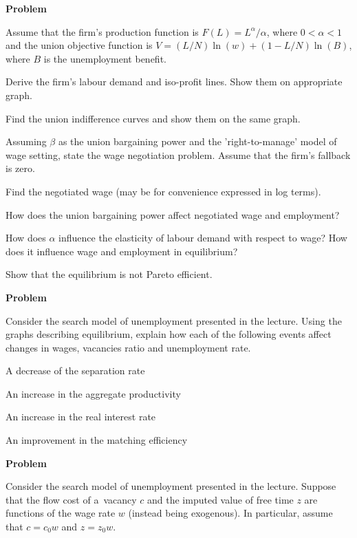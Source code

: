 \documentclass[a4paper, notitlepage, 11pt]{article}
\newcounter{zadlicz}[section]%
\newcommand{\tytul}[2]{\setcounter{equation}{0}\addtocounter{zadlicz}{1}\vspace{\abovedisplayskip}\noindent\textbf{#1\ \thezadlicz #2}}%
\begin{document}
\tytul{Problem}{}

\noindent%
Assume that the firm's production function is $F(L)=L^\alpha/\alpha$, where $0<\alpha<1$ and the union objective function is $V=(L/N)\ln(w)+(1-L/N)\ln(B)$, where $B$ is the unemployment benefit.

\begin{wylicz}
\item Derive the firm's labour demand and iso-profit lines. Show them on appropriate graph.
\item Find the union indifference curves and show them on the same graph.
\item Assuming $\beta$ as the union bargaining power and the 'right-to-manage' model of wage setting, state the wage negotiation problem. Assume that the firm's fallback is zero.
\item Find the negotiated wage (may be for convenience expressed in log terms).
\item How does the union bargaining power affect negotiated wage and employment?
\item How does $\alpha$ influence the elasticity of labour demand with respect to wage? How does it influence wage and employment in equilibrium?
\item Show that the equilibrium is not Pareto efficient.
\end{wylicz}

\tytul{Problem}{}

\noindent%
Consider the search model of unemployment presented in the lecture. Using the graphs describing equilibrium, explain how each of the following events affect changes in wages, vacancies ratio and unemployment rate.

\begin{wylicz}
 \item A decrease of the separation rate
 \item An increase in the aggregate productivity
 \item An increase in the real interest rate
 \item An improvement in the matching efficiency
\end{wylicz}


\tytul{Problem}{}

\noindent%
Consider the search model of unemployment presented in the lecture. Suppose that the flow cost of a~vacancy $c$ and the imputed value of free time $z$ are functions of the wage rate $w$ (instead being exogenous). In particular, assume that $c=c_0w$ and $z=z_0w$.
\end{document}
